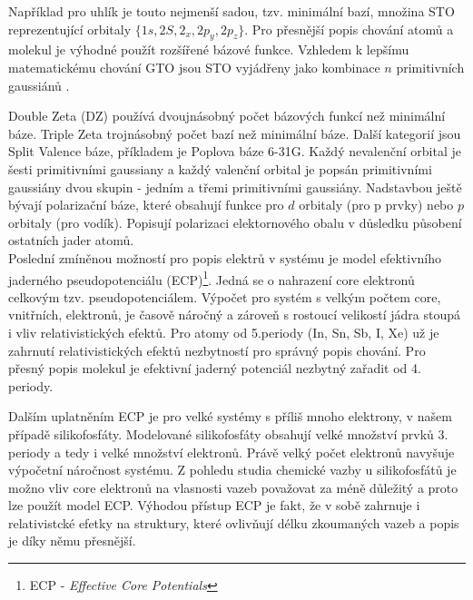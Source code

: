 \documentclass[
digital, %
table,   %
lof,     %
lot,     %
oneside,
]{fithesis3}
\begin{document}
Například pro uhlík je touto nejmenší sadou, tzv. minimální bazí, množina STO reprezentující orbitaly $\{1s, 2S, 2_x, 2p_y, 2p_z \}$. Pro přesnější popis chování atomů a molekul je výhodné použít rozšířené bázové funkce. Vzhledem k lepšímu matematickému chování GTO jsou STO vyjádřeny jako kombinace $n$ primitivních gaussiánů \cite{lowe2011quantum}.

Double Zeta (DZ) používá dvoujnásobný počet bázových funkcí než minimální báze. Triple Zeta trojnásobný počet bazí než minimální báze. Další kategorií jsou Split Valence báze, příkladem je Poplova báze 6-31G. Každý nevalenční orbital je šesti primitivními gaussiany a každý valenční orbital je popsán primitivními gaussiány dvou skupin - jedním a třemi primitivními gaussiány. Nadstavbou ještě bývají polarizační báze, které obsahují funkce pro $d$ orbitaly (pro p prvky) nebo $p$ orbitaly (pro vodík). Popisují polarizaci elektornového obalu v důsledku působení ostatních jader atomů. \\

Poslední zmíněnou možností pro popis elektrů v systému je model efektivního jaderného pseudopotenciálu (ECP)\footnote{ECP - \textit{Effective Core Potentials}}. Jedná se o nahrazení core elektronů celkovým tzv. pseudopotenciálem. Výpočet pro systém s velkým počtem core, vnitřních, elektronů, je časově náročný a zároveň s rostoucí velikostí jádra stoupá i vliv relativistických efektů. Pro atomy od 5.periody (In, Sn, Sb, I, Xe) už je zahrnutí relativistických efektů nezbytností pro správný popis chování. Pro přesný popis molekul je efektivní jaderný potenciál nezbytný zařadit od 4. periody.

Dalším uplatněním ECP je pro velké systémy s příliš mnoho elektrony, v našem případě silikofosfáty. Modelované silikofosfáty obsahují velké množství prvků 3. periody a tedy i velké množství elektronů. Právě velký počet elektronů navyšuje výpočetní náročnost systému. Z pohledu studia chemické vazby u silikofosfátů je možno vliv core elektronů na vlasnosti vazeb považovat za méně důležitý a proto lze použít model ECP. Výhodou přístup ECP je fakt, že v sobě zahrnuje i relativistcké efetky na struktury, které ovlivňují délku zkoumaných vazeb a popis je díky němu přesnější.
\end{document}
